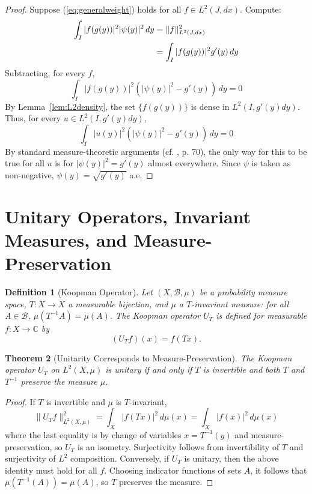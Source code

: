 \documentclass[12pt]{article}
\newtheorem{theorem}{Theorem}[section]
\newtheorem{definition}[theorem]{Definition}
\renewcommand{\eqref}[1]{(\ref{#1})}
\begin{document}
\begin{proof}
Suppose \eqref{eq:generalweight} holds for all $f \in L^2(J, dx)$. Compute:
\begin{align}
    \int_I |f(g(y))|^2 |\psi(y)|^2 \, dy &= \|f\|_{L^2(J,dx)}^2 \notag \\
    &= \int_I |f(g(y))|^2 g'(y) \, dy \label{eq:proofcov}
\end{align}
Subtracting, for every $f$,
\begin{equation}
    \int_I |f(g(y))|^2 (|\psi(y)|^2 - g'(y)) \, dy = 0
\end{equation}
By Lemma~\ref{lem:L2density}, the set $\{f(g(y))\}$ is dense in $L^2(I, g'(y)dy)$. Thus, for every $u \in L^2(I, g'(y)dy)$,
\begin{equation}
    \int_I |u(y)|^2 (|\psi(y)|^2 - g'(y)) \, dy = 0
\end{equation}
By standard measure-theoretic arguments (cf. \cite{Folland}, p. 70), the only way for this to be true for all $u$ is for $|\psi(y)|^2 = g'(y)$ almost everywhere. Since $\psi$ is taken as non-negative, $\psi(y) = \sqrt{g'(y)}$ a.e.
\end{proof}

\section{Unitary Operators, Invariant Measures, and Measure-Preservation}

\begin{definition}[Koopman Operator]\label{def:koopman}
Let $(X, \mathcal{B}, \mu)$ be a probability measure space, $T: X \rightarrow X$ a measurable bijection, and $\mu$ a $T$-invariant measure: for all $A \in \mathcal{B}$, $\mu(T^{-1}A) = \mu(A)$. The \emph{Koopman operator} $U_T$ is defined for measurable $f : X \to \mathbb{C}$ by
\begin{equation}\label{eq:koopman}
    (U_T f)(x) = f(Tx).
\end{equation}
\end{definition}

\begin{theorem}[Unitarity Corresponds to Measure-Preservation]\label{thm:measurepreserving_unitary}
The Koopman operator $U_T$ on $L^2(X,\mu)$ is unitary if and only if $T$ is invertible and both $T$ and $T^{-1}$ preserve the measure $\mu$.
\end{theorem}

\begin{proof}
If $T$ is invertible and $\mu$ is $T$-invariant,
\[
    \|U_T f\|_{L^2(X,\mu)}^2 = \int_X |f(Tx)|^2 \, d\mu(x) = \int_X |f(x)|^2 \, d\mu(x)
\]
where the last equality is by change of variables $x = T^{-1}(y)$ and measure-preservation, so $U_T$ is an isometry. Surjectivity follows from invertibility of $T$ and surjectivity of $L^2$ composition.
Conversely, if $U_T$ is unitary, then the above identity must hold for all $f$. Choosing indicator functions of sets $A$, it follows that $\mu(T^{-1}(A)) = \mu(A)$, so $T$ preserves the measure.
\end{proof}
\end{document}
